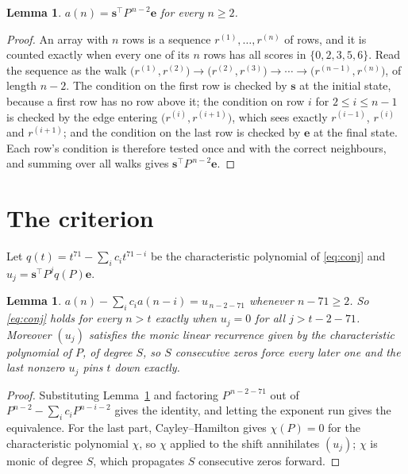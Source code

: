 \documentclass[11pt,a4paper]{article}
\theoremstyle{plain}
\newtheorem{lemma}[theorem]{Lemma}
\theoremstyle{definition}
\begin{document}
\begin{lemma}\label{lem:walk}
$a(n)=\mathbf{s}^{\!\top}P^{\,n-2}\mathbf{e}$ for every $n\ge2$.
\end{lemma}

\begin{proof}
An array with $n$ rows is a sequence $r^{(1)},\dots,r^{(n)}$ of rows, and it is counted
exactly when every one of its $n$ rows has all scores in $\{0,2,3,5,6\}$. Read the sequence as the
walk $\bigl(r^{(1)},r^{(2)}\bigr)\to\bigl(r^{(2)},r^{(3)}\bigr)\to\cdots\to
\bigl(r^{(n-1)},r^{(n)}\bigr)$, of length $n-2$. The condition on the first row is
checked by $\mathbf{s}$ at the initial state, because a first row has no row above it; the
condition on row $i$ for $2\le i\le n-1$ is checked by the edge entering
$\bigl(r^{(i)},r^{(i+1)}\bigr)$, which sees exactly $r^{(i-1)}$, $r^{(i)}$ and
$r^{(i+1)}$; and the condition on the last row is checked by $\mathbf{e}$ at the final
state. Each row's condition is therefore tested once and with the correct neighbours, and
summing over all walks gives $\mathbf{s}^{\!\top}P^{\,n-2}\mathbf{e}$.
\end{proof}

\section{The criterion}

Let $q(t)=t^{71}-\sum_i c_i t^{71-i}$ be the characteristic polynomial of
\eqref{eq:conj} and $u_j=\mathbf{s}^{\!\top}P^{j}q(P)\mathbf{e}$.

\begin{lemma}\label{lem:crit}
$a(n)-\sum_i c_i a(n-i)=u_{\,n-2-71}$ whenever $n-71\ge2$. So \eqref{eq:conj}
holds for every $n>t$ exactly when $u_j=0$ for all $j>t-2-71$. Moreover $(u_j)$
satisfies the monic linear recurrence given by the characteristic polynomial of $P$, of
degree $S$, so $S$ consecutive zeros force every later one and the last nonzero $u_j$ pins
$t$ down exactly.
\end{lemma}

\begin{proof}
Substituting Lemma~\ref{lem:walk} and factoring $P^{\,n-2-71}$ out of
$P^{n-2}-\sum_i c_i P^{n-i-2}$ gives the identity, and letting the exponent run gives the
equivalence. For the last part, Cayley--Hamilton gives $\chi(P)=0$ for the characteristic
polynomial $\chi$, so $\chi$ applied to the shift annihilates $(u_j)$; $\chi$ is monic of
degree $S$, which propagates $S$ consecutive zeros forward.
\end{proof}
\end{document}
